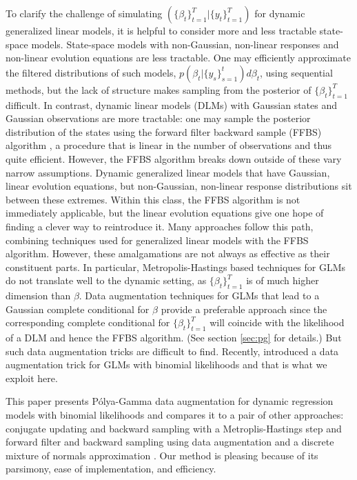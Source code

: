 \documentclass[12pt]{article}
\newcommand{\Polya}{P\'{o}lya}
\begin{document}
To clarify the challenge of simulating $(\{\beta_t\}_{t=1}^T | \{y_t\}_{t=1}^T)$
for dynamic generalized linear models, it is helpful to consider more and less
tractable state-space models.  State-space models with non-Gaussian, non-linear
responses and non-linear evolution equations are less tractable.  One may
efficiently approximate the filtered distributions of such models, $p(\beta_t |
\{y_s\}_{s=1}^t) d\beta_t$, using sequential methods, but the lack of structure
makes sampling from the posterior of $\{\beta_t\}_{t=1}^T$ difficult.  In
contrast, dynamic linear models (DLMs) with Gaussian states and Gaussian
observations are more tractable: one may sample the posterior distribution of
the states using the forward filter backward sample (FFBS) algorithm
\citep{carter-kohn-1994, fruhwirth-schnatter-1994}, a procedure that is linear
in the number of observations and thus quite efficient.  However, the FFBS
algorithm breaks down outside of these vary narrow assumptions.  Dynamic
generalized linear models that have Gaussian, linear evolution equations, but
non-Gaussian, non-linear response distributions sit between these extremes.
Within this class, the FFBS algorithm is not immediately applicable, but the
linear evolution equations give one hope of finding a clever way to reintroduce
it.  Many approaches follow this path, combining techniques used for generalized
linear models with the FFBS algorithm.  However, these amalgamations are not
always as effective as their constituent parts.  In particular,
Metropolis-Hastings based techniques for GLMs do not translate well to the
dynamic setting, as $\{\beta_t\}_{t=1}^T$ is of much higher dimension than
$\beta$.  Data augmentation techniques for GLMs that lead to a Gaussian complete
conditional for $\beta$ provide a preferable approach since the corresponding
complete conditional for $\{\beta_t\}_{t=1}^T$ will coincide with the likelihood
of a DLM and hence the FFBS algorithm.  (See section \ref{sec:pg} for details.)
But such data augmentation tricks are difficult to find.  Recently,
\cite{polson-etal-2013} introduced a data augmentation trick for GLMs with
binomial likelihoods and that is what we exploit here.

This paper presents \Polya-Gamma data augmentation for dynamic regression models
with binomial likelihoods and compares it to a pair of other approaches:
conjugate updating and backward sampling with a Metroplis-Hastings step
\citep{ravines-etal-2006} and forward filter and backward sampling using data
augmentation and a discrete mixture of normals approximation
\citep{fruhwirth-schnatter-etal-2009, fussl-etal-2013}.  Our method is pleasing
because of its parsimony, ease of implementation, and efficiency.  
\end{document}
